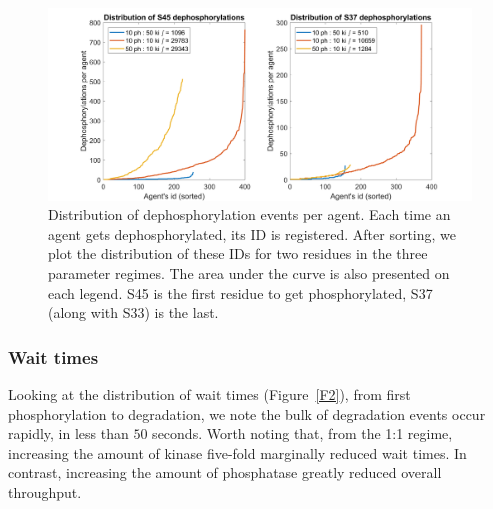 \begin{figure}[h]
  \centering
  \includegraphics[width=\columnwidth]{wnt/F1_distribution_dephosphorylations_per_agent_brief.png}
  \caption{Distribution of dephosphorylation events per agent. Each
    time an agent gets dephosphorylated, its ID is registered. After
    sorting, we plot the distribution of these IDs for two residues in
    the three parameter regimes. The area under the curve is also
    presented on each legend. S45 is the first residue to get
    phosphorylated, S37 (along with S33) is the last.}
  \label{F1}
\end{figure}


\subsubsection*{Wait times}
Looking at the distribution of wait times (Figure~\ref{F2}), from
first phosphorylation to degradation, we note the bulk of degradation
events occur rapidly, in less than $50$ seconds. Worth noting that,
from the 1:1 regime, increasing the amount of kinase five-fold
marginally reduced wait times. In contrast, increasing the amount of
phosphatase greatly reduced overall throughput.

